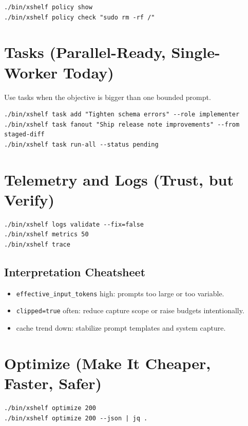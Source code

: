 \documentclass[11pt]{article}
\begin{document}
\begin{lstlisting}[style=cx]
./bin/xshelf policy show
./bin/xshelf policy check "sudo rm -rf /"
\end{lstlisting}

\section{Tasks (Parallel-Ready, Single-Worker Today)}
Use tasks when the objective is bigger than one bounded prompt.

\begin{lstlisting}[style=cx]
./bin/xshelf task add "Tighten schema errors" --role implementer
./bin/xshelf task fanout "Ship release note improvements" --from staged-diff
./bin/xshelf task run-all --status pending
\end{lstlisting}

\section{Telemetry and Logs (Trust, but Verify)}
\begin{lstlisting}[style=cx]
./bin/xshelf logs validate --fix=false
./bin/xshelf metrics 50
./bin/xshelf trace
\end{lstlisting}

\subsection*{Interpretation Cheatsheet}
\begin{itemize}
  \item \texttt{effective\_input\_tokens} high: prompts too large or too variable.
  \item \texttt{clipped=true} often: reduce capture scope or raise budgets intentionally.
  \item cache trend down: stabilize prompt templates and system capture.
\end{itemize}

\section{Optimize (Make It Cheaper, Faster, Safer)}
\begin{lstlisting}[style=cx]
./bin/xshelf optimize 200
./bin/xshelf optimize 200 --json | jq .
\end{lstlisting}
\end{document}
